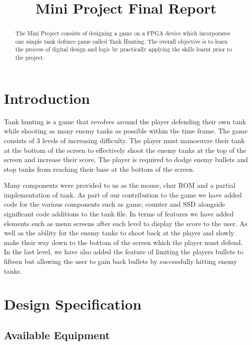 \documentclass{article}
\title{Mini Project Final Report}
\begin{document}


\maketitle

\begin{abstract}

The Mini Project consists of designing a game on a FPGA device which incorporates one simple tank defence game called Tank Hunting. The overall objective is to learn the process of digital design and logic by practically applying the skills learnt prior to the project.

\end{abstract}

\section{Introduction}

Tank hunting is a game that revolves around the player defending their own tank while shooting as many enemy tanks as possible within the time frame. The game consists of 3 levels of increasing difficulty. The player must manoeuvre their tank at the bottom of the screen to effectively shoot the enemy tanks at the top of the screen and increase their score. The player is required to dodge enemy bullets and stop tanks from reaching their base at the bottom of the screen.

Many components were provided to us as the mouse, char ROM and a partial implementation of tank. As part of our contribution to the game we have added code for the various components such as game, counter and SSD alongside significant code additions to the tank file. In terms of features we have added elements such as menu screens after each level to display the score to the user. As well as the ability for the enemy tanks to shoot back at the player and slowly make their way down to the bottom of the screen which the player must defend. In the last level, we have also added the feature of limiting the players bullets to fifteen but allowing the user to gain back bullets by successfully hitting enemy tanks.

\section{Design Specification}

\subsection{Available Equipment}
\end{document}

